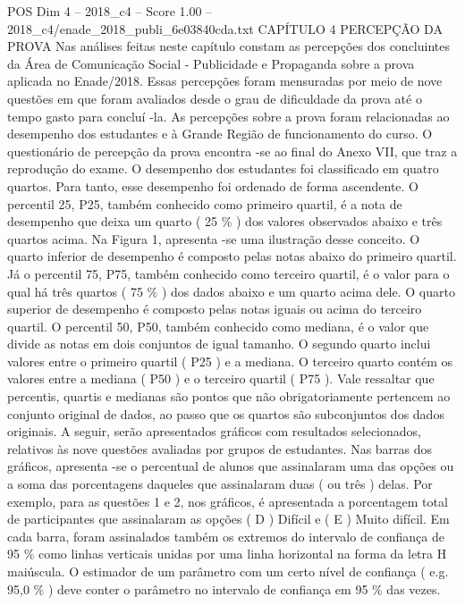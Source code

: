 \begin{textsample}{POS Dim 4 – 2018\_c4 – Score 1.00 – 2018\_c4/enade\_2018\_publi\_6e03840cda.txt}  \label{ex:f4_pos_188}
CAPÍTULO 4 PERCEPÇÃO DA PROVA Nas análises feitas neste capítulo constam as percepções dos concluintes da Área de Comunicação Social - Publicidade e Propaganda sobre a prova aplicada no Enade/2018.
Essas percepções foram mensuradas por meio de nove questões em que foram avaliados desde o grau de dificuldade da prova até o tempo gasto para concluí -la.
As percepções sobre a prova foram relacionadas ao desempenho dos estudantes e à Grande Região de funcionamento do curso.
O questionário de percepção da prova encontra -se ao final do Anexo VII, que traz a reprodução do exame.
O desempenho dos estudantes foi classificado em quatro quartos.
Para tanto, esse desempenho foi ordenado de forma ascendente.
O percentil 25, P25, também conhecido como primeiro quartil, é a nota de desempenho que deixa um quarto ( 25 \% ) dos valores observados abaixo e três quartos acima.
Na Figura 1, apresenta -se uma ilustração desse conceito.
O quarto inferior de desempenho é composto pelas notas abaixo do primeiro quartil.
Já o percentil 75, P75, também conhecido como terceiro quartil, é o valor para o qual há três quartos ( 75 \% ) dos dados abaixo e um quarto acima dele.
O quarto superior de desempenho é composto pelas notas iguais ou acima do terceiro quartil.
O percentil 50, P50, também conhecido como mediana, é o valor que divide as notas em dois conjuntos de igual tamanho.
O segundo quarto inclui valores entre o primeiro quartil ( P25 ) e a mediana.
O terceiro quarto contém os valores entre a mediana ( P50 ) e o terceiro quartil ( P75 ).
Vale ressaltar que percentis, quartis e medianas são pontos que não obrigatoriamente pertencem ao conjunto original de dados, ao passo que os quartos são subconjuntos dos dados originais.
A seguir, serão apresentados gráficos com resultados selecionados, relativos às nove questões avaliadas por grupos de estudantes.
Nas barras dos gráficos, apresenta -se o percentual de alunos que assinalaram uma das opções ou a soma das porcentagens daqueles que assinalaram duas ( ou três ) delas.
Por exemplo, para as questões 1 e 2, nos gráficos, é apresentada a porcentagem total de participantes que assinalaram as opções ( D ) Difícil e ( E ) Muito difícil.
Em cada barra, foram assinalados também os extremos do intervalo de confiança de 95 \% como linhas verticais unidas por uma linha horizontal na forma da letra H maiúscula.
O estimador de um parâmetro com um certo nível de confiança ( e.g. 95,0 \% ) deve conter o parâmetro no intervalo de confiança em 95 \% das vezes.

\end{textsample}

